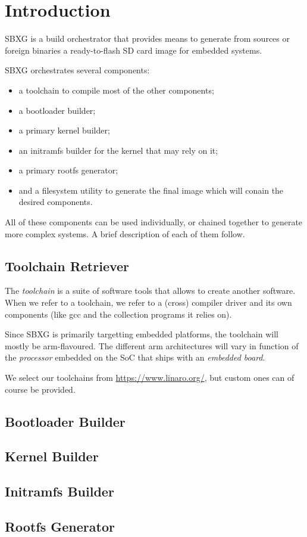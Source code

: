 \documentclass{article}
\begin{document}
\section{Introduction}

SBXG is a build orchestrator that provides means to generate from sources or
foreign binaries a ready-to-flash SD card image for embedded systems.

SBXG orchestrates several components:
\begin{itemize}
\item a toolchain to compile most of the other components;
\item a bootloader builder;
\item a primary kernel builder;
\item an initramfs builder for the kernel that may rely on it;
\item a primary rootfs generator;
\item and a filesystem utility to generate the final image which will conain the
  desired components.
\end{itemize}

All of these components can be used individually, or chained together to
generate more complex systems. A brief description of each of them follow.

\subsection{Toolchain Retriever}

The \emph{toolchain} is a suite of software tools that allows to create another
software. When we refer to a toolchain, we refer to a (cross) compiler driver
and its own components (like gcc and the collection programs it relies on).

Since SBXG is primarily targetting embedded platforms, the toolchain will mostly
be arm-flavoured. The different arm architectures will vary in function of the
\emph{processor} embedded on the SoC that ships with an \emph{embedded board}.

We select our toolchains from \url{https://www.linaro.org/}, but custom ones can
of course be provided.


\subsection{Bootloader Builder}
\subsection{Kernel Builder}
\subsection{Initramfs Builder}
\subsection{Rootfs Generator}
\end{document}
